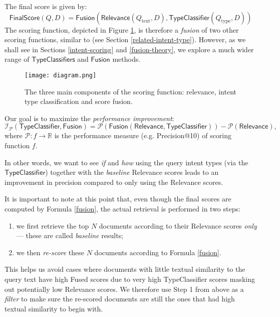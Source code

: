 The final score is given by:
\begin{equation}\label{fusion}
  \textsf{FinalScore}(Q, D) = \textsf{Fusion}\left(\textsf{Relevance}(Q_{\text{text}}, D), \textsf{TypeClassifier}(Q_{\text{type}}, D)\right)
\end{equation}
The scoring function, depicted in Figure \ref{diagram},
is therefore a \emph{fusion} of two other scoring functions,
similar to \cite{choi, choi-prev, limsi2015, FDUMedSearch} (see Section \ref{related-intent-type}).
However, as we shall see in Sections \ref{intent-scoring} and \ref{fusion-theory},
we explore a much wider range of $\textsf{TypeClassifiers}$ and $\textsf{Fusion}$ methods.

\begin{figure}
\centerline{
  \texttt{[image: diagram.png]}
  }
  \caption{The three main components of the scoring function:
  relevance, intent type classification and score fusion.}
  \label{diagram}
\end{figure}

Our goal is to maximize the \emph{performance improvement}:
\begin{equation}\label{improvement-formula}
   \mathcal{I}_{\mathcal{P}}(\textsf{TypeClassifier}, \textsf{Fusion})
   =\mathcal{P}(\textsf{Fusion}(\textsf{Relevance}, \textsf{TypeClassifier})) - \mathcal{P}(\textsf{Relevance}),
\end{equation}
where $\mathcal{P}: f \rightarrow \mathbb{R}$ is the performance measure (e.g. Precision@10) of scoring function $f$.

In other words, we want to see \emph{if} and \emph{how} using the query intent types (via the
$\textsf{TypeClassifier}$) together with the \emph{baseline} \textsf{Relevance} scores
leads to an improvement in precision compared to only using the \textsf{Relevance} scores.

It is important to note at this point that, even though the final scores are computed by Formula \ref{fusion},
the actual retrieval is performed in two steps:
\begin{enumerate}
 \item we first retrieve the top $N$ documents according to their \textsf{Relevance} scores \emph{only} --- these are called
 \emph{baseline} results;
 \vspace{-0.2cm}
 \item we then \emph{re-score} these $N$ documents according to Formula \ref{fusion}.
\end{enumerate}
This helps us avoid cases where documents with little textual similarity to the query text
have high \textsf{Fused} scores due to very high \textsf{TypeClassifier} scores masking out potentially low \textsf{Relevance} scores.
We therefore use Step 1 from above as a \emph{filter} to make sure the re-scored documents are still the ones that had high textual
similarity to begin with.

